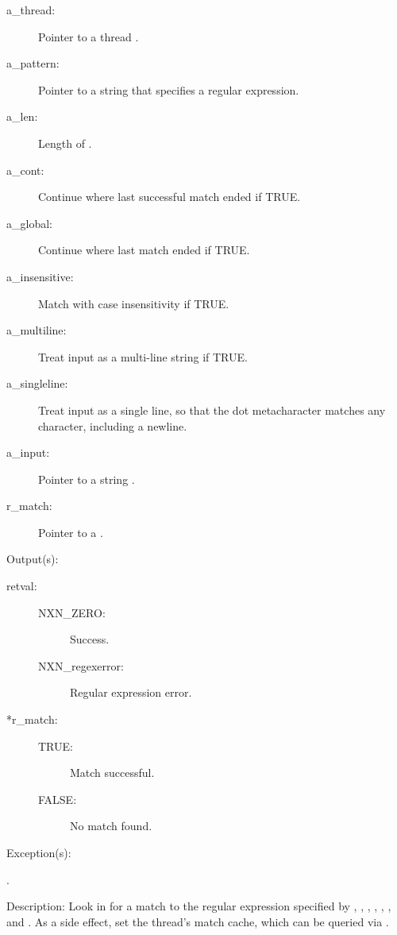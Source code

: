 \begin{capi}
\begin{capilist}
		\begin{description}\item[]
		\item[a\_thread: ]
			Pointer to a thread .
		\item[a\_pattern: ]
			Pointer to a string that specifies a regular expression.
		\item[a\_len: ]
			Length of .
		\item[a\_cont: ]
			Continue where last successful match ended if TRUE.
		\item[a\_global: ]
			Continue where last match ended if TRUE.
		\item[a\_insensitive: ]
			Match with case insensitivity if TRUE.
		\item[a\_multiline: ]
			Treat input as a multi-line string if TRUE.
		\item[a\_singleline: ]
			Treat input as a single line, so that the dot
			metacharacter matches any character, including a
			newline.
		\item[a\_input: ]
			Pointer to a string .
		\item[r\_match: ]
			Pointer to a .
		\end{description}
	\item[Output(s): ]
		\begin{description}\item[]
		\item[retval: ]
			\begin{description}\item[]
			\item[NXN\_ZERO: ] Success.
			\item[NXN\_regexerror: ] Regular expression error.
			\end{description}
		\item[*r\_match: ]
			\begin{description}\item[]
			\item[TRUE: ] Match successful.
			\item[FALSE: ] No match found.
			\end{description}
		\end{description}
	\item[Exception(s): ]
		\begin{description}\item[]
		\item[.]
		\end{description}
	\item[Description: ]
		Look in  for a match to the regular expression
		specified by , , ,
		, , ,
		and .  As a side effect, set the thread's
		match cache, which can be queried via
		.


\end{capilist}
\end{capi}
